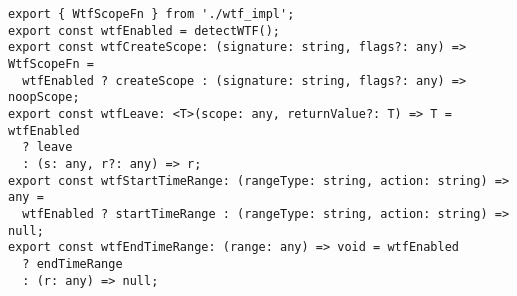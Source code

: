 \begin{verbatim}
export { WtfScopeFn } from './wtf_impl';
export const wtfEnabled = detectWTF();
export const wtfCreateScope: (signature: string, flags?: any) => WtfScopeFn =
  wtfEnabled ? createScope : (signature: string, flags?: any) => noopScope;
export const wtfLeave: <T>(scope: any, returnValue?: T) => T = wtfEnabled
  ? leave
  : (s: any, r?: any) => r;
export const wtfStartTimeRange: (rangeType: string, action: string) => any =
  wtfEnabled ? startTimeRange : (rangeType: string, action: string) => null;
export const wtfEndTimeRange: (range: any) => void = wtfEnabled
  ? endTimeRange
  : (r: any) => null;
\end{verbatim}
